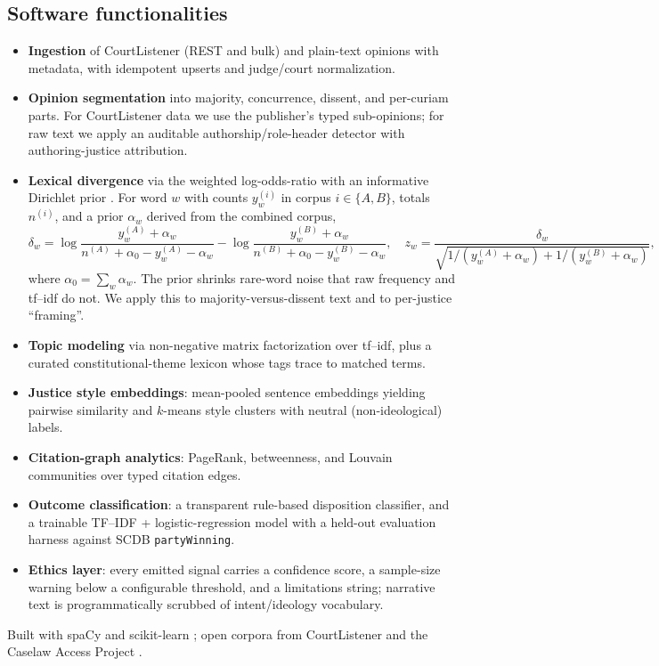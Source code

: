 \documentclass[preprint,12pt]{elsarticle}
\begin{document}
\subsection{Software functionalities}
\begin{itemize}
  \item \textbf{Ingestion} of CourtListener \cite{freelaw} (REST and bulk) and plain-text opinions
        with metadata, with idempotent upserts and judge/court normalization.
  \item \textbf{Opinion segmentation} into majority, concurrence, dissent, and per-curiam parts. For
        CourtListener data we use the publisher's typed sub-opinions; for raw text we apply an
        auditable authorship/role-header detector with authoring-justice attribution.
  \item \textbf{Lexical divergence} via the weighted log-odds-ratio with an informative Dirichlet
        prior \cite{monroe2008fightin}. For word $w$ with counts $y^{(i)}_w$ in corpus
        $i\in\{A,B\}$, totals $n^{(i)}$, and a prior $\alpha_w$ derived from the combined corpus,
        \begin{equation}
        \delta_w = \log\!\frac{y^{(A)}_w+\alpha_w}{n^{(A)}+\alpha_0-y^{(A)}_w-\alpha_w}
                 - \log\!\frac{y^{(B)}_w+\alpha_w}{n^{(B)}+\alpha_0-y^{(B)}_w-\alpha_w},
        \quad
        z_w = \frac{\delta_w}{\sqrt{1/(y^{(A)}_w+\alpha_w)+1/(y^{(B)}_w+\alpha_w)}},
        \end{equation}
        where $\alpha_0=\sum_w \alpha_w$. The prior shrinks rare-word noise that raw frequency and
        tf--idf do not. We apply this to majority-versus-dissent text and to per-justice ``framing''.
  \item \textbf{Topic modeling} via non-negative matrix factorization \cite{lee1999nmf} over tf--idf,
        plus a curated constitutional-theme lexicon whose tags trace to matched terms.
  \item \textbf{Justice style embeddings}: mean-pooled sentence embeddings
        \cite{reimers2019sentencebert} yielding pairwise similarity and $k$-means style clusters with
        neutral (non-ideological) labels.
  \item \textbf{Citation-graph analytics}: PageRank, betweenness, and Louvain communities
        \cite{blondel2008louvain} over typed citation edges.
  \item \textbf{Outcome classification}: a transparent rule-based disposition classifier, and a
        trainable TF--IDF + logistic-regression model with a held-out evaluation harness against SCDB
        \texttt{partyWinning}.
  \item \textbf{Ethics layer}: every emitted signal carries a confidence score, a sample-size warning
        below a configurable threshold, and a limitations string; narrative text is programmatically
        scrubbed of intent/ideology vocabulary.
\end{itemize}
Built with spaCy \cite{honnibal2020spacy} and scikit-learn \cite{pedregosa2011scikit}; open corpora
from CourtListener \cite{freelaw} and the Caselaw Access Project \cite{cap}.
\end{document}
